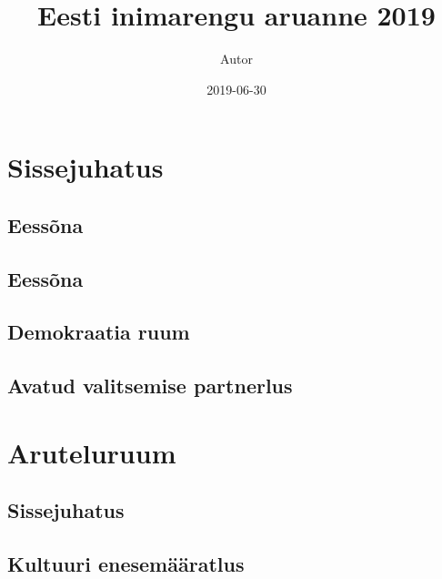 \documentclass[]{book}
\title{Eesti inimarengu aruanne 2019}
\author{Autor}
\date{2019-06-30}
\begin{document}
\maketitle

{
\setcounter{tocdepth}{1}
\tableofcontents
}
\hypertarget{sissejuhatus}{%
\chapter*{Sissejuhatus}\label{sissejuhatus}}

\hypertarget{eessona}{%
\section*{Eessõna}\label{eessona}}

\hypertarget{eessona-1}{%
\section*{Eessõna}\label{eessona-1}}

\hypertarget{demokraatia-ruum}{%
\section*{Demokraatia ruum}\label{demokraatia-ruum}}

\hypertarget{avatud-valitsemise-partnerlus}{%
\section*{Avatud valitsemise partnerlus}\label{avatud-valitsemise-partnerlus}}

\hypertarget{chapter1}{%
\chapter{Aruteluruum}\label{chapter1}}

\hypertarget{sissejuhatus-1}{%
\section*{Sissejuhatus}\label{sissejuhatus-1}}

\hypertarget{chapter1_2}{%
\section{Kultuuri enesemääratlus}\label{chapter1_2}}
\end{document}
